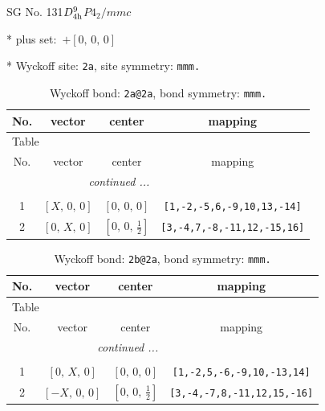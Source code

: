 \documentclass[fleqn,8pt]{jsarticle}
\begin{document}
\setcounter{MaxMatrixCols}{32}

\renewcommand{\tablename}{Table~}
\renewcommand{\figurename}{Figure~}
\begin{center}
\LARGE
SG No. 131\quad$D_{\rm 4h}^{9}$\quad$P4_2/mmc$\quad[ tetragonal ]
\end{center}

* plus set:\,\,\,$+\left[ 0,\, 0,\, 0 \right]$


* Wyckoff site: {\tt 2a}, site symmetry: {\tt mmm.}
\renewcommand{\arraystretch}{1.2}
\begin{longtable}{cccc}
\caption{Wyckoff bond: {\tt 2a@2a}, bond symmetry: {\tt mmm.}}
 \\
 \hline \hline
No. & vector & center & mapping \\ \hline \endfirsthead

\multicolumn{3}{l}{\tablename\ \thetable{}} \\
 \hline \hline
No. & vector & center & mapping \\ \hline \endhead

 \hline \hline
\multicolumn{3}{r}{\footnotesize\it continued ...} \\ \endfoot

 \hline \hline
\multicolumn{3}{r}{} \\ \endlastfoot

1 & $\left[ X,\, 0,\, 0 \right]$ & $\left[ 0,\, 0,\, 0 \right]$ & {\tt [1,-2,-5,6,-9,10,13,-14]} \\ \hline
2 & $\left[ 0,\, X,\, 0 \right]$ & $\left[ 0,\, 0,\, \frac{1}{2} \right]$ & {\tt [3,-4,7,-8,-11,12,-15,16]} \\
\end{longtable}
\renewcommand{\arraystretch}{1.2}
\begin{longtable}{cccc}
\caption{Wyckoff bond: {\tt 2b@2a}, bond symmetry: {\tt mmm.}}
 \\
 \hline \hline
No. & vector & center & mapping \\ \hline \endfirsthead

\multicolumn{3}{l}{\tablename\ \thetable{}} \\
 \hline \hline
No. & vector & center & mapping \\ \hline \endhead

 \hline \hline
\multicolumn{3}{r}{\footnotesize\it continued ...} \\ \endfoot

 \hline \hline
\multicolumn{3}{r}{} \\ \endlastfoot

1 & $\left[ 0,\, X,\, 0 \right]$ & $\left[ 0,\, 0,\, 0 \right]$ & {\tt [1,-2,5,-6,-9,10,-13,14]} \\ \hline
2 & $\left[ - X,\, 0,\, 0 \right]$ & $\left[ 0,\, 0,\, \frac{1}{2} \right]$ & {\tt [3,-4,-7,8,-11,12,15,-16]} \\
\end{longtable}
\end{document}
